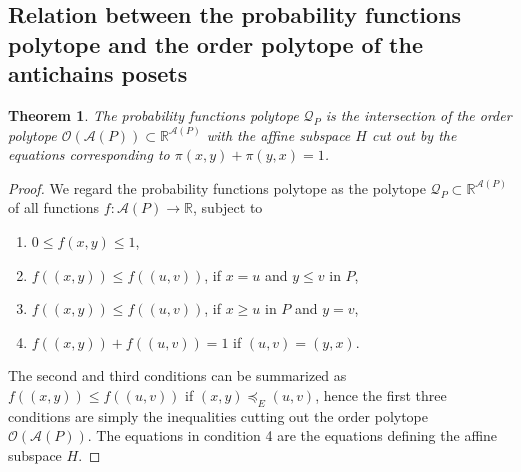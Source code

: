 \documentclass[11pt,a4paper,abstract=yes]{scrartcl}
\theoremstyle{plain}
\newtheorem{theorem}{Theorem}[section]
\newcommand{\RR}{\mathbb{R}}
\newcommand{\prpolytope}[1]{\mathcal{Q}_{#1}}
\newcommand{\orderpolytope}[1]{\mathcal{O}({#1})}
\newcommand{\transerel}{\preceq_{E}}
\newcommand{\twoanti}[1]{\mathcal{A}({#1})}
\begin{document}
\subsection{Relation between the probability functions polytope and the order polytope of the antichains posets}
\label{sec:orgccf695c}
\begin{theorem}
The probability functions polytope \(\prpolytope{P}\) is the intersection of the order polytope
\(\orderpolytope{\twoanti{P}} \subset \RR^{\twoanti{P}}\)
with the affine subspace \(H\) cut out by the equations corresponding to \(\pi(x,y) + \pi(y,x)=1\).
\label{thm-poset2polytope}
\end{theorem}
\begin{proof}
We regard the probability functions polytope  as the polytope \(\prpolytope{P} \subset \RR^{{\twoanti{P}}}\) of all functions
\(f: \twoanti{P} \to \RR\), subject to
\begin{enumerate}
\item \(0 \le f(x,y) \le 1\),
\item \(f((x,y)) \le f((u,v))\), if \(x=u\) and \(y \le v\) in \(P\),
\item \(f((x,y)) \le f((u,v))\), if \(x \ge u\) in \(P\) and \(y =v\),
\item \(f((x,y)) + f((u,v)) = 1\) if \((u,v) = (y,x)\).
\end{enumerate}
The second and third conditions can be summarized as
\(f((x,y)) \le f((u,v))\) if \((x,y) \transerel (u,v)\), hence the first three conditions are simply
the inequalities cutting out the order polytope \(\orderpolytope{\twoanti{P}}\).
The equations in condition 4 are the equations defining the affine subspace \(H\).
\end{proof}
\end{document}

